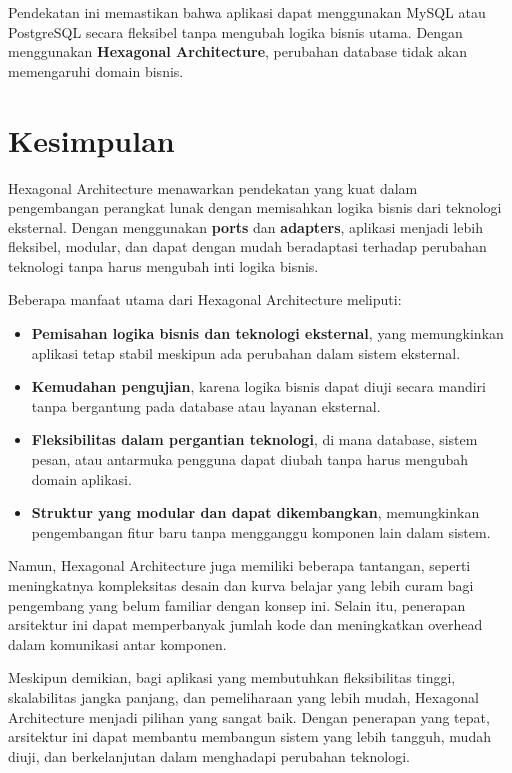 Pendekatan ini memastikan bahwa aplikasi dapat menggunakan MySQL atau PostgreSQL secara fleksibel tanpa mengubah logika bisnis utama. Dengan menggunakan \textbf{Hexagonal Architecture}, perubahan database tidak akan memengaruhi domain bisnis.


\section{Kesimpulan}

Hexagonal Architecture menawarkan pendekatan yang kuat dalam pengembangan perangkat lunak dengan memisahkan logika bisnis dari teknologi eksternal. Dengan menggunakan \textbf{ports} dan \textbf{adapters}, aplikasi menjadi lebih fleksibel, modular, dan dapat dengan mudah beradaptasi terhadap perubahan teknologi tanpa harus mengubah inti logika bisnis.

Beberapa manfaat utama dari Hexagonal Architecture meliputi:
\begin{itemize}
	\item \textbf{Pemisahan logika bisnis dan teknologi eksternal}, yang memungkinkan aplikasi tetap stabil meskipun ada perubahan dalam sistem eksternal.
	\item \textbf{Kemudahan pengujian}, karena logika bisnis dapat diuji secara mandiri tanpa bergantung pada database atau layanan eksternal.
	\item \textbf{Fleksibilitas dalam pergantian teknologi}, di mana database, sistem pesan, atau antarmuka pengguna dapat diubah tanpa harus mengubah domain aplikasi.
	\item \textbf{Struktur yang modular dan dapat dikembangkan}, memungkinkan pengembangan fitur baru tanpa mengganggu komponen lain dalam sistem.
\end{itemize}

Namun, Hexagonal Architecture juga memiliki beberapa tantangan, seperti meningkatnya kompleksitas desain dan kurva belajar yang lebih curam bagi pengembang yang belum familiar dengan konsep ini. Selain itu, penerapan arsitektur ini dapat memperbanyak jumlah kode dan meningkatkan overhead dalam komunikasi antar komponen.

Meskipun demikian, bagi aplikasi yang membutuhkan fleksibilitas tinggi, skalabilitas jangka panjang, dan pemeliharaan yang lebih mudah, Hexagonal Architecture menjadi pilihan yang sangat baik. Dengan penerapan yang tepat, arsitektur ini dapat membantu membangun sistem yang lebih tangguh, mudah diuji, dan berkelanjutan dalam menghadapi perubahan teknologi.



